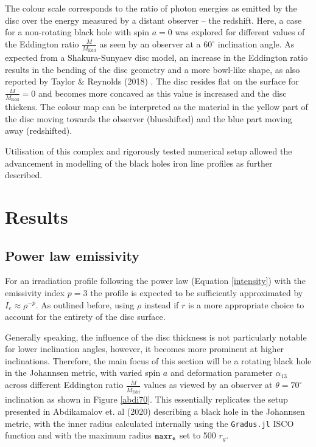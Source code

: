 \documentclass[fleqn,usenatbib,useAMS]{mnras}
\begin{document}
The colour scale corresponds to the ratio of photon energies as emitted by the disc over the energy measured by a distant observer -- the redshift. Here, a case for a non-rotating black hole with spin $a = 0$ was explored for different values of the Eddington ratio $\frac{\dot M}{M_{\text{Edd}}}$ as seen by an observer at a $60^{\circ}$ inclination angle. As expected from a Shakura-Sunyaev \cite{shakura1973black} disc model, an increase in the Eddington ratio results in the bending of the disc geometry and a more bowl-like shape, as also reported by Taylor \& Reynolds (2018) \cite{taylor2018exploring}. The disc resides flat on the surface for $\frac{\dot M}{M_{\text{Edd}}} = 0$ and becomes more concaved as this value is increased and the disc thickens. The colour map can be interpreted as the material in the yellow part of the disc moving towards the observer (blueshifted) and the blue part moving away (redshifted).

Utilisation of this complex and rigorously tested numerical setup allowed the advancement in  modelling of the black holes iron line profiles as further described.

\section{Results}

\subsection{Power law emissivity}
For an irradiation profile following the power law (Equation \ref{intensity}) with the emissivity index $p = 3$ the profile is expected to be sufficiently approximated by $I_{e} \approx \rho^{-p}$. As outlined before, using $\rho$ instead if $r$ is a more appropriate choice to account for the entirety of the disc surface. 

Generally speaking, the influence of the disc thickness is not particularly notable for lower inclination angles, however, it becomes more prominent at higher inclinations. Therefore, the main focus of this section will be a rotating black hole in the Johannsen metric, with varied spin $a$ and deformation parameter $\alpha_{13}$ across different Eddington ratio $\frac{\dot{M}}{\dot{M}_\text{Edd}}$ values as viewed by an observer at $\theta = 70^{\circ}$ inclination as shown in Figure \ref{abdi70}. This essentially replicates the setup presented in Abdikamalov et. al (2020) \cite{abdikamalov2020testing} describing a black hole in the Johannsen metric, with the inner radius calculated internally using the {\tt Gradus.jl} ISCO function and with the maximum radius ${\tt maxr_{e}}$ set to 500 $r_{g}$.
\end{document}
